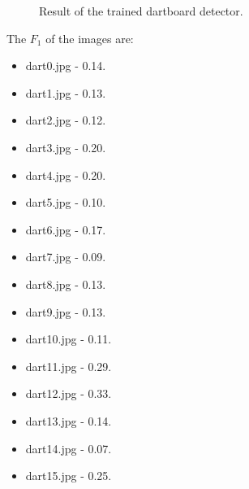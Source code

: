 \documentclass[a4paper]{article}
\begin{document}
\begin{figure}[H]
  \centering
  \hfill
   \hfill
   \hfill
   \hfill
   \caption{Result of the trained dartboard detector.}
\end{figure}

The \(F_{1}\) of the images are:
\begin{multicols}{4}
    \begin{itemize}
		\item dart0.jpg - 0.14.
        \item dart1.jpg - 0.13.
        \item dart2.jpg - 0.12.
        \item dart3.jpg - 0.20.
        \item dart4.jpg - 0.20.
        \item dart5.jpg - 0.10.
        \item dart6.jpg - 0.17.
        \item dart7.jpg - 0.09.
        \item dart8.jpg - 0.13.
        \item dart9.jpg - 0.13.
        \item dart10.jpg - 0.11.
        \item dart11.jpg - 0.29.
        \item dart12.jpg - 0.33.
        \item dart13.jpg - 0.14.
        \item dart14.jpg - 0.07.
        \item dart15.jpg - 0.25.
    \end{itemize}
\end{multicols}
\end{document}
